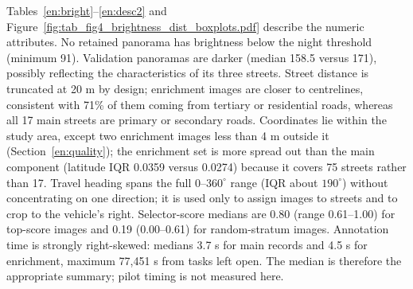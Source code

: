 Tables~\ref{en:bright}--\ref{en:desc2} and Figure~\ref{fig:tab_fig4_brightness_dist_boxplots.pdf} describe the numeric attributes. No retained panorama has brightness below the night threshold (minimum 91). Validation panoramas are darker (median 158.5 versus 171), possibly reflecting the characteristics of its three streets. Street distance is truncated at 20 m by design; enrichment images are closer to centrelines, consistent with 71\% of them coming from tertiary or residential roads, whereas all 17 main streets are primary or secondary roads. Coordinates lie within the study area, except two enrichment images less than 4 m outside it (Section~\ref{en:quality}); the enrichment set is more spread out than the main component (latitude IQR 0.0359 versus 0.0274) because it covers 75 streets rather than 17. Travel heading spans the full 0--$360^\circ$ range (IQR about $190^\circ$) without concentrating on one direction; it is used only to assign images to streets and to crop to the vehicle's right. Selector-score medians are 0.80 (range 0.61--1.00) for top-score images and 0.19 (0.00--0.61) for random-stratum images. Annotation time is strongly right-skewed: medians 3.7 s for main records and 4.5 s for enrichment, maximum 77,451 s from tasks left open. The median is therefore the appropriate summary; pilot timing is not measured here.

